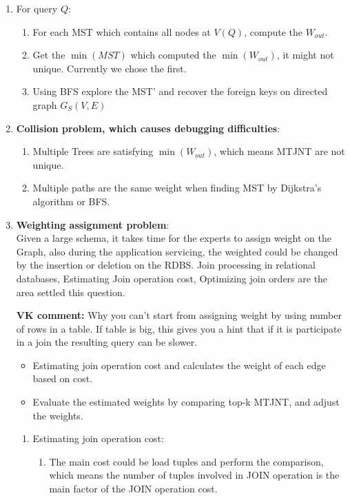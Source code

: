\begin{enumerate}
\begin{enumerate}
{\bf VK comment:} What is BFS?

  \item For query $Q$:
    \begin{enumerate}
    \item For each MST which contains all nodes at $V(Q)$, compute the $W_{out}$.
    \item Get the $\min(MST)$ which computed the $\min(W_{out})$, it might not unique. Currently we chose the first.
    \item Using BFS explore the MST' and recover the foreign keys on directed graph $G_S(V,E)$
  \end{enumerate}
\item {\bf Collision problem, which causes debugging difficulties}:
  \begin{enumerate} 
  \item Multiple Trees are satisfying $\min(W_{out})$, which means MTJNT are not unique.
  \item Multiple paths are the same weight when finding MST by Dijkstra's algorithm or BFS.
  \end{enumerate}
\item {\bf Weighting assignment problem}: \\
Given a large schema, it takes time for the experts to assign weight on the Graph, also during the application servicing, the weighted could be changed by the insertion or deletion on the RDBS. Join processing in relational databases, Estimating Join operation cost, Optimizing join orders are the area settled this question. 

{\bf VK comment:} Why you can't start from assigning weight by using number of rows in a table.
If table is big, this gives you a hint that if it is participate in a join the resulting query
can be slower.

  \begin{itemize}
  \item Estimating join operation cost and calculates the weight of each edge based on cost.
  \item Evaluate the estimated weights by comparing top-k MTJNT, and adjust the weights.
  \end{itemize}
  \begin{enumerate}
  \item Estimating join operation cost: 
    \begin{enumerate}
    \item The main cost could be load tuples and perform the comparison, which means the number of tuples involved in JOIN operation is the main factor of the JOIN operation cost.\\


\end{enumerate}
\end{enumerate}
\end{enumerate}
\end{enumerate}
